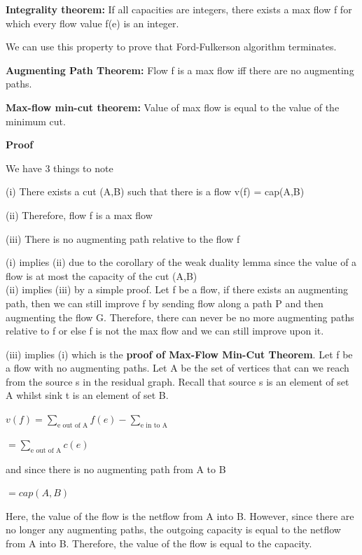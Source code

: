\documentclass[11pt, oneside]{article}
\theoremstyle{definition}
\begin{document}
\textbf{Integrality theorem:} If all capacities are integers, there exists a max flow f for which every flow value f(e) is an integer.

We can use this property to prove that Ford-Fulkerson algorithm terminates.

\textbf{Augmenting Path Theorem:} Flow f is a max flow iff there are no augmenting paths.

\textbf{Max-flow min-cut theorem:} Value of max flow is equal to the value of the minimum cut.

\textbf{Proof}
\begin{addmargin}[1em]{2em}%
We have 3 things to note

(i) There exists a cut (A,B) such that there is a flow v(f) = cap(A,B)

(ii) Therefore, flow f is a max flow

(iii) There is no augmenting path relative to the flow f
  \begin{addmargin}[3em]{4em}
    (i) implies (ii) due to the corollary of the weak duality lemma since the value of a flow is at most the capacity of the cut (A,B)\\

    (ii) implies (iii) by a simple proof. Let f be a flow, if there exists an augmenting path, then we can still improve f by sending flow along a path P and then augmenting the flow G. Therefore, there can never be no more augmenting paths relative to f or else f is not the max flow and we can still improve upon it.

    (iii) implies (i) which is the \textbf{proof of Max-Flow Min-Cut Theorem}. Let f be a flow with no augmenting paths. Let A be the set of vertices that can we reach from the source s in the residual graph. Recall that source s is an element of set A whilst sink t is an element of set B.
    \begin{center}
      $v(f) = \sum_{\text{e out of A}}f(e) - \sum_{\text{e in to A}}$

      $= \sum_{\text{e out of A}}c(e)$

      and since there is no augmenting path from A to B

      $= cap(A,B)$
    \end{center}
    Here, the value of the flow is the netflow from A into B. However, since there are no longer any augmenting paths, the outgoing capacity is equal to the netflow from A into B. Therefore, the value of the flow is equal to the capacity.
  \end{addmargin}
\end{addmargin}
\end{document}
